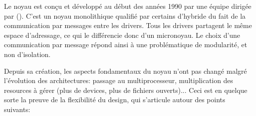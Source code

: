\begin{correction}

Le noyau  est con\c{c}u et d\'{e}velopp\'{e} au d\'{e}but des ann\'{e}es
1990 par une \'{e}quipe dirig\'{e}e par  (). C'est
un noyau monolithique qualifi\'{e} par certains d'hybride du fait de la communication
par messages entre les drivers. Tous les drivers partagent le m\^{e}me espace d'adressage,
ce qui le diff\'{e}rencie donc d'un micronoyau. Le choix d'une communication par message
r\'{e}pond ainsi \`{a} une probl\'{e}matique de modularit\'{e}, et non d'isolation.

Depuis sa cr\'{e}ation, les aspects fondamentaux du noyau n'ont pas chang\'{e}
malgr\'{e} l'\'{e}volution des architectures: passage au multiprocesseur, multiplication
des resources \`{a} g\'{e}rer (plus de devices, plus de fichiers ouverts)... Ceci est
en quelque sorte la preuve de la flexibilit\'{e} du design, qui s'articule autour des
points suivants:


\end{correction}
